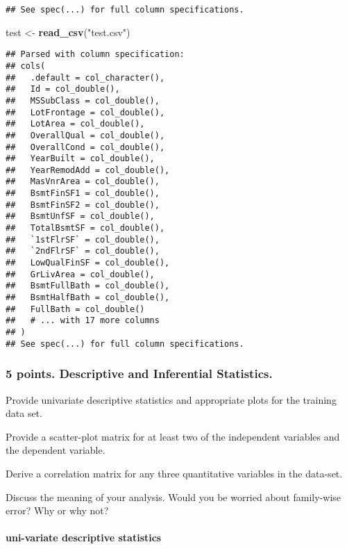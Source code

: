 \documentclass[]{article}
\newenvironment{Shaded}{\begin{snugshade}}{\end{snugshade}}
\newcommand{\KeywordTok}[1]{\textcolor[rgb]{0.13,0.29,0.53}{\textbf{#1}}}
\newcommand{\NormalTok}[1]{#1}
\newcommand{\StringTok}[1]{\textcolor[rgb]{0.31,0.60,0.02}{#1}}
\let\oldparagraph\paragraph
\renewcommand{\paragraph}[1]{\oldparagraph{#1}\mbox{}}
\begin{document}
\begin{verbatim}
## See spec(...) for full column specifications.
\end{verbatim}

\begin{Shaded}
\begin{Highlighting}[]
\NormalTok{test <-}\StringTok{ }\KeywordTok{read_csv}\NormalTok{(}\StringTok{"test.csv"}\NormalTok{)}
\end{Highlighting}
\end{Shaded}

\begin{verbatim}
## Parsed with column specification:
## cols(
##   .default = col_character(),
##   Id = col_double(),
##   MSSubClass = col_double(),
##   LotFrontage = col_double(),
##   LotArea = col_double(),
##   OverallQual = col_double(),
##   OverallCond = col_double(),
##   YearBuilt = col_double(),
##   YearRemodAdd = col_double(),
##   MasVnrArea = col_double(),
##   BsmtFinSF1 = col_double(),
##   BsmtFinSF2 = col_double(),
##   BsmtUnfSF = col_double(),
##   TotalBsmtSF = col_double(),
##   `1stFlrSF` = col_double(),
##   `2ndFlrSF` = col_double(),
##   LowQualFinSF = col_double(),
##   GrLivArea = col_double(),
##   BsmtFullBath = col_double(),
##   BsmtHalfBath = col_double(),
##   FullBath = col_double()
##   # ... with 17 more columns
## )
## See spec(...) for full column specifications.
\end{verbatim}

\hypertarget{points.-descriptive-and-inferential-statistics.}{%
\subsubsection{5 points. Descriptive and Inferential
Statistics.}\label{points.-descriptive-and-inferential-statistics.}}

Provide univariate descriptive statistics and appropriate plots for the
training data set.

Provide a scatter-plot matrix for at least two of the independent
variables and the dependent variable.

Derive a correlation matrix for any three quantitative variables in the
data-set.

Discuss the meaning of your analysis. Would you be worried about
family-wise error? Why or why not?

\hypertarget{uni-variate-descriptive-statistics}{%
\paragraph{uni-variate descriptive
statistics}\label{uni-variate-descriptive-statistics}}
\end{document}
